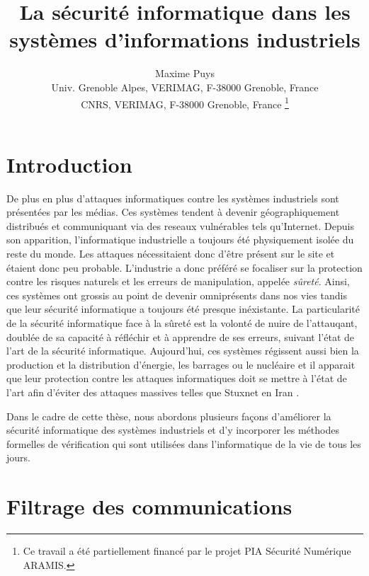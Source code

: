 \documentclass{article}
\title{La sécurité informatique dans les systèmes d'informations industriels}
\author{
    Maxime Puys\\
    Univ. Grenoble Alpes, VERIMAG, F-38000 Grenoble, France\\
    CNRS, VERIMAG, F-38000 Grenoble, France
    \thanks{Ce travail a été partiellement financé par le projet PIA Sécurité Numérique ARAMIS.}
}
\date{}
\begin{document}
\maketitle


\section{Introduction}

De plus en plus d'attaques informatiques contre les systèmes industriels sont
présentées par les médias.
Ces systèmes tendent à devenir géographiquement distribués et communiquant via
des reseaux vulnérables tels qu'Internet.
Depuis son apparition, l'informatique industrielle a toujours été physiquement
isolée du reste du monde.
Les attaques nécessitaient donc d'être présent sur le site et étaient donc peu
probable.
L'industrie a donc préféré se focaliser sur la protection contre les risques
naturels et les erreurs de manipulation, appelée {\em sûreté}.
Ainsi, ces systèmes ont grossis au point de devenir omniprésents dans nos
vies tandis que leur sécurité informatique a toujours été presque inéxistante.
La particularité de la sécurité informatique face à la sûreté est la volonté
de nuire de l'attauqant, doublée de sa capacité à réfléchir et à apprendre de
ses erreurs, suivant l'état de l'art de la sécurité informatique.
Aujourd'hui, ces systèmes régissent aussi bien la production et la distribution
d'énergie, les barrages ou le nucléaire et il apparait que leur protection
contre les attaques informatiques doit se mettre à l'état de l'art afin d'éviter
des attaques massives telles que Stuxnet en Iran \cite{Lan11}.

Dans le cadre de cette thèse, nous abordons plusieurs façons d'améliorer la
sécurité informatique des systèmes industriels et d'y incorporer les méthodes
formelles de vérification qui sont utilisées dans l'informatique de la vie de 
tous les jours.

\section{Filtrage des communications}
\end{document}
